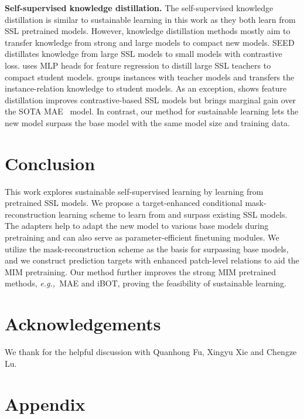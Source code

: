 \documentclass{article} \usepackage{iclr2023_conference,times}
\newcommand{\myPara}[1]{\vspace{-.05in} \noindent\textbf{#1}}
\def\eg{\emph{e.g.,~}}
\begin{document}
\myPara{Self-supervised knowledge distillation.}
The self-supervised knowledge distillation is similar to sustainable learning in this work
as they both learn from SSL pretrained models.
However, knowledge distillation methods mostly aim to transfer knowledge from strong and large models to compact new models.
SEED \citep{fang2021seed} distillates knowledge from large SSL models to small models with contrastive loss.
\citep{navaneet2022simreg} uses MLP heads for feature regression to distill large SSL teachers to compact student models.
\citep{xu2021bag} groups instances with teacher models and transfers the instance-relation knowledge to student models.
As an exception, \citep{wei2022contrastive} shows feature distillation improves contrastive-based SSL models but brings marginal gain over the SOTA MAE~\citep{he2022masked} model.
In contrast, our method for sustainable learning lets the new model surpass the base model with the same model size and training data. 


\vspace{-3pt}
\section{Conclusion}
\vspace{-3pt}
This work explores sustainable self-supervised learning by learning from pretrained SSL models.
We propose a target-enhanced conditional mask-reconstruction learning scheme to learn from and surpass existing SSL models.
The adapters help to adapt the new model to various base models during pretraining
and can also serve as parameter-efficient finetuning modules.
We utilize the mask-reconstruction scheme as the basis for surpassing base models,
and we construct prediction targets with enhanced patch-level relations to aid the MIM pretraining.
Our method further improves the strong MIM pretrained methods, \eg MAE and iBOT, 
proving the feasibility of sustainable learning.


\section{Acknowledgements}
We thank for the helpful discussion with Quanhong Fu, Xingyu Xie and Chengze Lu.




\clearpage
\appendix
\section{Appendix}
\end{document}
